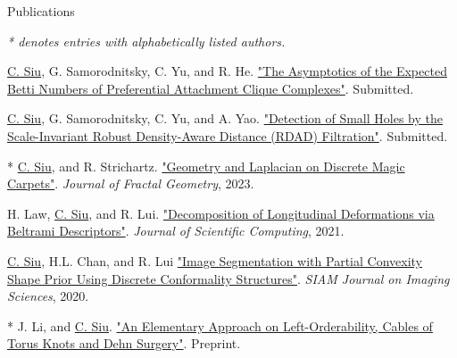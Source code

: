 \documentclass{resume} %
\begin{document}
\begin{rSection}{Publications}

\emph{* denotes entries with alphabetically listed authors.}

\underline{C. Siu}, G. Samorodnitsky, C. Yu, and R. He. \href{https://arxiv.org/abs/2305.11259}{"The Asymptotics of the Expected Betti Numbers of Preferential Attachment Clique Complexes"}. Submitted.

\underline{C. Siu}, G. Samorodnitsky, C. Yu, and A. Yao. \href{https://arxiv.org/abs/2204.07821}{"Detection of Small Holes by the Scale-Invariant Robust Density-Aware Distance (RDAD) Filtration"}. Submitted.

* \underline{C. Siu}, and R. Strichartz. \href{https://ems.press/journals/jfg/articles/10964400}{"Geometry and Laplacian on Discrete Magic Carpets"}. \emph{Journal of Fractal Geometry}, 2023.

H. Law, \underline{C. Siu}, and R. Lui. \href{https://doi.org/10.1007/s10915-021-01569-x}{"Decomposition of Longitudinal Deformations via Beltrami Descriptors"}. \emph{Journal of Scientific Computing}, 2021.

\underline{C. Siu}, H.L. Chan, and R. Lui \href{https://doi.org/10.1137/19M129718X}{"Image Segmentation with Partial Convexity Shape Prior Using Discrete Conformality Structures"}. \emph{SIAM Journal on Imaging Sciences}, 2020.

* J. Li, and \underline{C. Siu}. \href{https://arxiv.org/abs/1610.00898}{"An Elementary Approach on Left-Orderability, Cables of Torus Knots and Dehn Surgery"}. Preprint.




\end{rSection}
\end{document}
